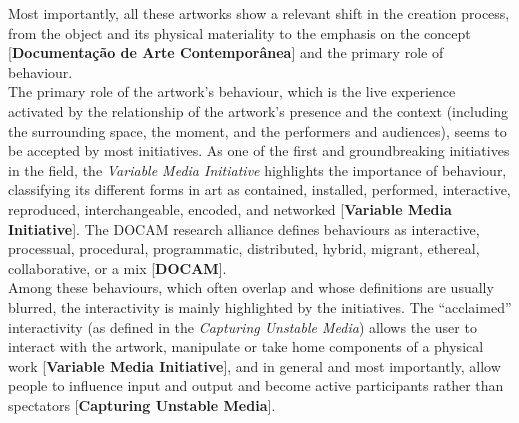 Most importantly, all these artworks show a relevant shift in the creation process, from the object and its physical materiality to the emphasis on the concept [\textbf{Documentação de Arte Contemporânea}] and the primary role of behaviour.\\
The primary role of the artwork’s behaviour, which is the live experience activated by the relationship of the artwork’s presence and the context (including the surrounding space, the moment, and the performers and audiences), seems to be accepted by most initiatives. As one of the first and groundbreaking initiatives in the field, the \textit{Variable Media Initiative} highlights the importance of behaviour, classifying its different forms in art as contained, installed, performed, interactive, reproduced, interchangeable, encoded, and networked [\textbf{Variable Media Initiative}]. The DOCAM research alliance defines behaviours as interactive, processual, procedural, programmatic, distributed, hybrid, migrant, ethereal, collaborative, or a mix [\textbf{DOCAM}].\\
Among these behaviours, which often overlap and whose definitions are usually blurred, the interactivity is mainly highlighted by the initiatives. The ``acclaimed'' interactivity (as defined in the \textit{Capturing Unstable Media}) allows the user to interact with the artwork, manipulate or take home components of a physical work [\textbf{Variable Media Initiative}], and in general and most importantly, allow people to influence input and output and become active participants rather than spectators [\textbf{Capturing Unstable Media}].

